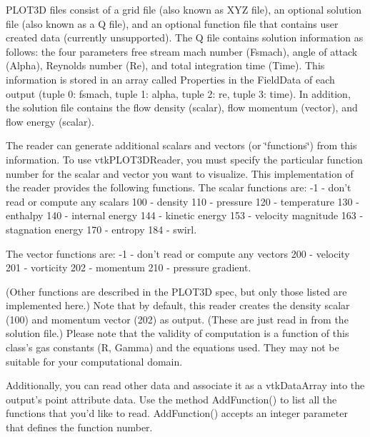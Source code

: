 P\-L\-O\-T3\-D files consist of a grid file (also known as X\-Y\-Z file), an optional solution file (also known as a Q file), and an optional function file that contains user created data (currently unsupported). The Q file contains solution information as follows\-: the four parameters free stream mach number (Fsmach), angle of attack (Alpha), Reynolds number (Re), and total integration time (Time). This information is stored in an array called Properties in the Field\-Data of each output (tuple 0\-: fsmach, tuple 1\-: alpha, tuple 2\-: re, tuple 3\-: time). In addition, the solution file contains the flow density (scalar), flow momentum (vector), and flow energy (scalar).

The reader can generate additional scalars and vectors (or \char`\"{}functions\char`\"{}) from this information. To use vtk\-P\-L\-O\-T3\-D\-Reader, you must specify the particular function number for the scalar and vector you want to visualize. This implementation of the reader provides the following functions. The scalar functions are\-: -\/1 -\/ don't read or compute any scalars 100 -\/ density 110 -\/ pressure 120 -\/ temperature 130 -\/ enthalpy 140 -\/ internal energy 144 -\/ kinetic energy 153 -\/ velocity magnitude 163 -\/ stagnation energy 170 -\/ entropy 184 -\/ swirl.

The vector functions are\-: -\/1 -\/ don't read or compute any vectors 200 -\/ velocity 201 -\/ vorticity 202 -\/ momentum 210 -\/ pressure gradient.

(Other functions are described in the P\-L\-O\-T3\-D spec, but only those listed are implemented here.) Note that by default, this reader creates the density scalar (100) and momentum vector (202) as output. (These are just read in from the solution file.) Please note that the validity of computation is a function of this class's gas constants (R, Gamma) and the equations used. They may not be suitable for your computational domain.

Additionally, you can read other data and associate it as a vtk\-Data\-Array into the output's point attribute data. Use the method Add\-Function() to list all the functions that you'd like to read. Add\-Function() accepts an integer parameter that defines the function number.

